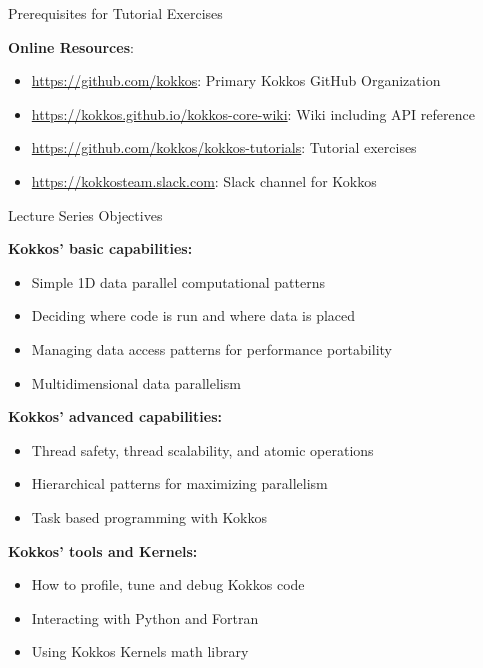\begin{frame}{Prerequisites for Tutorial Exercises}

\textbf{Online Resources}:

\begin{itemize}
	\item \url{https://github.com/kokkos}: Primary Kokkos GitHub Organization
	\item \url{https://kokkos.github.io/kokkos-core-wiki}: Wiki including API reference
	\item \url{https://github.com/kokkos/kokkos-tutorials}: Tutorial exercises
	\item \url{https://kokkosteam.slack.com}: Slack channel for Kokkos
\end{itemize}

\end{frame}



\begin{frame}{Lecture Series Objectives}



  \textbf{Kokkos' basic capabilities:}
  \begin{itemize}
    \item {Simple 1D data parallel computational patterns}
    \item {Deciding where code is run and where data is placed}
    \item {Managing data access patterns for performance portability}
    \item {Multidimensional data parallelism}
  \end{itemize}


  \textbf{Kokkos' advanced capabilities:}
  \begin{itemize}
    \item {Thread safety, thread scalability, and atomic operations}
    \item {Hierarchical patterns for maximizing parallelism}
    \item {Task based programming with Kokkos}
  \end{itemize}


  \textbf{Kokkos' tools and Kernels:}
  \begin{itemize}
    \item {How to profile, tune and debug Kokkos code}
    \item {Interacting with Python and Fortran}
    \item {Using Kokkos Kernels math library}
  \end{itemize}

\end{frame}

